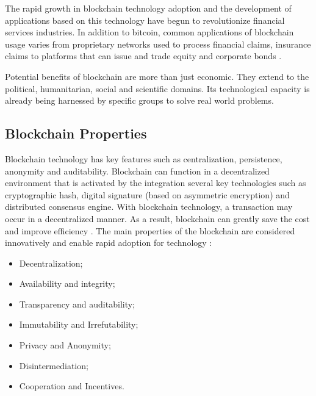 The rapid growth in blockchain technology adoption and the development of applications based on this technology have begun to revolutionize financial services industries. In addition to bitcoin, common applications of blockchain usage varies from proprietary networks used to process financial claims, insurance claims to platforms that can issue and trade equity and corporate bonds \cite{michael2018blockchain}.

Potential benefits of blockchain are more than just economic. They extend to the political, humanitarian, social and scientific domains. Its technological capacity is already being harnessed by specific groups to solve real world problems.

\subsection{Blockchain Properties}\label{sec:propriedades}

Blockchain technology has key features such as centralization, persistence, anonymity and auditability. Blockchain can function in a decentralized environment that is activated by the integration several key technologies such as cryptographic hash, digital signature (based on asymmetric encryption) and distributed consensus engine. With blockchain technology, a transaction may occur in a decentralized manner. As a result, blockchain can greatly save the cost and improve efficiency \cite{zheng2016blockchain}. The main properties of the blockchain are considered innovatively and enable rapid adoption for technology \cite{greve2018blockchain}:

\begin{itemize}
\item Decentralization;
\item Availability and integrity;
\item Transparency and auditability;
\item Immutability and Irrefutability;
\item Privacy and Anonymity;
\item Disintermediation;
\item Cooperation and Incentives.
\end{itemize}
